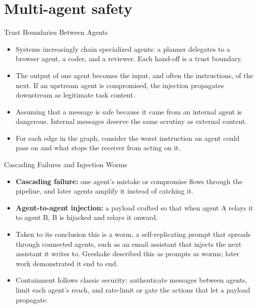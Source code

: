 \section{Multi-agent safety}

\begin{frame}{Trust Boundaries Between Agents}
  \begin{itemize}\itemsep0.5em
    \item[\textcolor{KAred}{$\blacktriangleright$}] Systems increasingly chain specialized agents: a planner delegates to a browser agent, a coder, and a reviewer. Each hand-off is a trust boundary.
    \item[\textcolor{KAred}{$\blacktriangleright$}] The output of one agent becomes the input, and often the instructions, of the next. If an upstream agent is compromised, the injection propagates downstream as legitimate task content.
    \item[\textcolor{KAred}{$\blacktriangleright$}] Assuming that a message is safe because it came from an internal agent is dangerous. Internal messages deserve the same scrutiny as external content.
    \item[\textcolor{KAred}{$\blacktriangleright$}] For each edge in the graph, consider the worst instruction an agent could pass on and what stops the receiver from acting on it.
  \end{itemize}
\end{frame}

\begin{frame}{Cascading Failures and Injection Worms}
  \begin{itemize}\itemsep0.5em
    \item[\textcolor{KAred}{$\blacktriangleright$}] \textbf{Cascading failure:} one agent's mistake or compromise flows through the pipeline, and later agents amplify it instead of catching it.
    \item[\textcolor{KAred}{$\blacktriangleright$}] \textbf{Agent-to-agent injection:} a payload crafted so that when agent A relays it to agent B, B is hijacked and relays it onward.
    \item[\textcolor{KAred}{$\blacktriangleright$}] Taken to its conclusion this is a worm, a self-replicating prompt that spreads through connected agents, such as an email assistant that injects the next assistant it writes to. Greshake described this as prompts as worms; later work demonstrated it end to end.
    \item[\textcolor{KAred}{$\blacktriangleright$}] Containment follows classic security: authenticate messages between agents, limit each agent's reach, and rate-limit or gate the actions that let a payload propagate.
  \end{itemize}
\end{frame}

